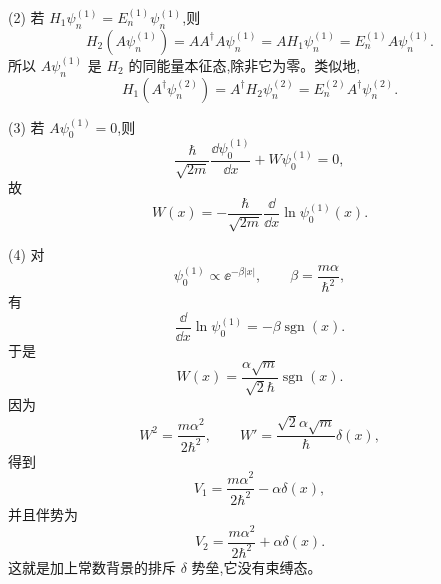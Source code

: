 \begin{question}
\begin{solution}
(2) 若 $H_1\psi_n^{(1)}=E_n^{(1)}\psi_n^{(1)}$,则
\[
H_2(A\psi_n^{(1)})=AA^\dagger A\psi_n^{(1)}=A H_1\psi_n^{(1)}
=E_n^{(1)}A\psi_n^{(1)}.
\]
所以 $A\psi_n^{(1)}$ 是 $H_2$ 的同能量本征态,除非它为零。类似地,
\[
H_1(A^\dagger\psi_n^{(2)})=A^\dagger H_2\psi_n^{(2)}
=E_n^{(2)}A^\dagger\psi_n^{(2)}.
\]

(3) 若 $A\psi_0^{(1)}=0$,则
\[
\frac{\hbar}{\sqrt{2m}}\frac{\dd\psi_0^{(1)}}{\dd x}+W\psi_0^{(1)}=0,
\]
故
\[
\boxed{W(x)=-\frac{\hbar}{\sqrt{2m}}\frac{\dd}{\dd x}\ln\psi_0^{(1)}(x).}
\]

(4) 对
\[
\psi_0^{(1)}\propto \ee^{-\beta|x|},
\qquad
\beta=\frac{m\alpha}{\hbar^2},
\]
有
\[
\frac{\dd}{\dd x}\ln\psi_0^{(1)}=-\beta\operatorname{sgn}(x).
\]
于是
\[
\boxed{W(x)=\frac{\alpha\sqrt m}{\sqrt2\hbar}\operatorname{sgn}(x).}
\]
因为
\[
W^2=\frac{m\alpha^2}{2\hbar^2},
\qquad
W'=\frac{\sqrt2\alpha\sqrt m}{\hbar}\delta(x),
\]
得到
\[
V_1=\frac{m\alpha^2}{2\hbar^2}-\alpha\delta(x),
\]
并且伴势为
\[
\boxed{V_2=\frac{m\alpha^2}{2\hbar^2}+\alpha\delta(x).}
\]
这就是加上常数背景的排斥 $\delta$ 势垒,它没有束缚态。
\end{solution}
\end{question}

